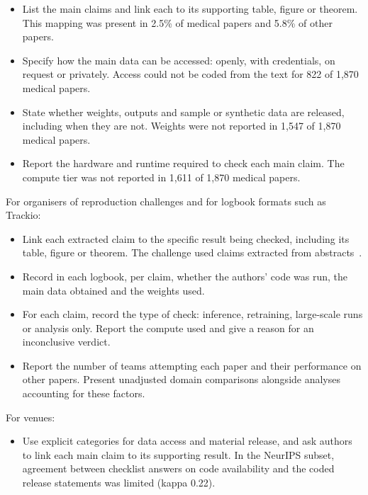 \documentclass[11pt]{article}
\begin{document}
\begin{itemize}
\item List the main claims and link each to its supporting table, figure or theorem. This mapping was present in 2.5\% of medical papers and 5.8\% of other papers.
\item Specify how the main data can be accessed: openly, with credentials, on request or privately. Access could not be coded from the text for 822 of 1,870 medical papers.
\item State whether weights, outputs and sample or synthetic data are released, including when they are not. Weights were not reported in 1,547 of 1,870 medical papers.
\item Report the hardware and runtime required to check each main claim. The compute tier was not reported in 1,611 of 1,870 medical papers.
\end{itemize}

For organisers of reproduction challenges and for logbook formats such as Trackio:

\begin{itemize}
\item Link each extracted claim to the specific result being checked, including its table, figure or theorem. The challenge used claims extracted from abstracts~\cite{r9}.
\item Record in each logbook, per claim, whether the authors' code was run, the main data obtained and the weights used.
\item For each claim, record the type of check: inference, retraining, large-scale runs or analysis only. Report the compute used and give a reason for an inconclusive verdict.
\item Report the number of teams attempting each paper and their performance on other papers. Present unadjusted domain comparisons alongside analyses accounting for these factors.
\end{itemize}

For venues:

\begin{itemize}
\item Use explicit categories for data access and material release, and ask authors to link each main claim to its supporting result. In the NeurIPS subset, agreement between checklist answers on code availability and the coded release statements was limited (kappa 0.22).
\end{itemize}
\end{document}

